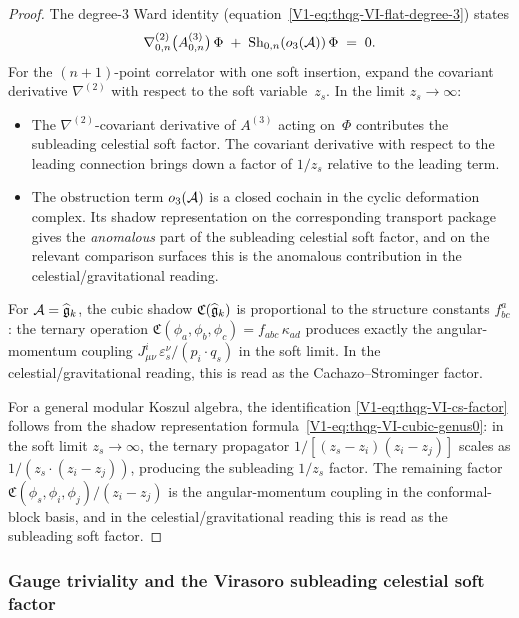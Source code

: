 \begin{proof}
The degree-$3$ Ward identity
(equation~\eqref{V1-eq:thqg-VI-flat-degree-3}) states
\[
\nabla^{(2)}_{0,n}\bigl(A^{(3)}_{0,n}\bigr)\,\Phi
\;+\;
\operatorname{Sh}_{0,n}(o_3(\mathcal{A}))\,\Phi
\;=\; 0.
\]
For the $(n+1)$-point correlator with one soft insertion, expand the
covariant derivative $\nabla^{(2)}$ with respect to the soft
variable~$z_s$. In the limit $z_s \to \infty$:
\begin{itemize}
\item The $\nabla^{(2)}$-covariant derivative of $A^{(3)}$ acting
 on~$\Phi$ contributes the subleading celestial soft factor. The covariant
 derivative with respect to the leading connection brings down
 a factor of $1/z_s$ relative to the leading term.
\item The obstruction term $o_3(\mathcal{A})$ is a closed cochain in the
 cyclic deformation complex. Its shadow representation on
 the corresponding transport package gives the
 \emph{anomalous} part of the subleading celestial soft factor,
 and on the relevant comparison surfaces this is the
 anomalous contribution in the celestial/gravitational reading.
\end{itemize}

For $\mathcal{A} = \widehat{\mathfrak{g}}_k$, the cubic shadow
$\mathfrak{C}(\widehat{\mathfrak{g}}_k)$ is proportional to the structure
constants $f^a_{bc}$: the ternary operation
$\mathfrak{C}(\phi_a, \phi_b, \phi_c) = f_{abc}\,\kappa_{ad}$
produces exactly the angular-momentum coupling
$J^i_{\mu\nu}\,\varepsilon_s^\nu/(p_i \cdot q_s)$ in the
soft limit. In the celestial/gravitational reading, this is read as the
Cachazo--Strominger factor.

For a general modular Koszul algebra, the identification
\eqref{V1-eq:thqg-VI-cs-factor} follows from the shadow
representation formula~\eqref{V1-eq:thqg-VI-cubic-genus0}: in the
soft limit $z_s \to \infty$, the ternary propagator
$1/[(z_s - z_i)(z_i - z_j)]$ scales as $1/(z_s \cdot (z_i - z_j))$,
producing the subleading $1/z_s$ factor. The remaining factor
$\mathfrak{C}(\phi_s, \phi_i, \phi_j)/(z_i - z_j)$ is the
angular-momentum coupling in the conformal-block basis, and in the
celestial/gravitational reading this is read as the subleading soft factor.
\end{proof}

\subsubsection{Gauge triviality and the Virasoro subleading celestial soft factor}

